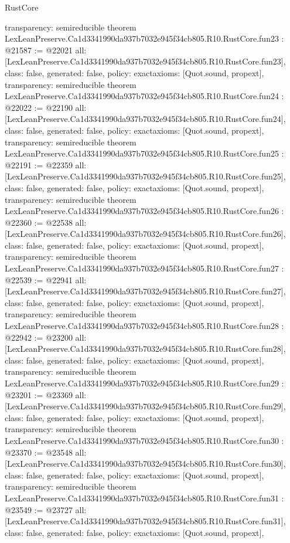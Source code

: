 \begin{lexlean}{RustCore}
\begin{coremodule}
{  transparency: semireducible
}
theorem LexLeanPreserve.Ca1d3341990da937b7032e945f34cb805.R10.RustCore.fun23 : @21587 := @22021 {
  all: [LexLeanPreserve.Ca1d3341990da937b7032e945f34cb805.R10.RustCore.fun23],
  class: false,
  generated: false,
  policy: exact{axioms: [Quot.sound, propext]},
  transparency: semireducible
}
theorem LexLeanPreserve.Ca1d3341990da937b7032e945f34cb805.R10.RustCore.fun24 : @22022 := @22190 {
  all: [LexLeanPreserve.Ca1d3341990da937b7032e945f34cb805.R10.RustCore.fun24],
  class: false,
  generated: false,
  policy: exact{axioms: [Quot.sound, propext]},
  transparency: semireducible
}
theorem LexLeanPreserve.Ca1d3341990da937b7032e945f34cb805.R10.RustCore.fun25 : @22191 := @22359 {
  all: [LexLeanPreserve.Ca1d3341990da937b7032e945f34cb805.R10.RustCore.fun25],
  class: false,
  generated: false,
  policy: exact{axioms: [Quot.sound, propext]},
  transparency: semireducible
}
theorem LexLeanPreserve.Ca1d3341990da937b7032e945f34cb805.R10.RustCore.fun26 : @22360 := @22538 {
  all: [LexLeanPreserve.Ca1d3341990da937b7032e945f34cb805.R10.RustCore.fun26],
  class: false,
  generated: false,
  policy: exact{axioms: [Quot.sound, propext]},
  transparency: semireducible
}
theorem LexLeanPreserve.Ca1d3341990da937b7032e945f34cb805.R10.RustCore.fun27 : @22539 := @22941 {
  all: [LexLeanPreserve.Ca1d3341990da937b7032e945f34cb805.R10.RustCore.fun27],
  class: false,
  generated: false,
  policy: exact{axioms: [Quot.sound, propext]},
  transparency: semireducible
}
theorem LexLeanPreserve.Ca1d3341990da937b7032e945f34cb805.R10.RustCore.fun28 : @22942 := @23200 {
  all: [LexLeanPreserve.Ca1d3341990da937b7032e945f34cb805.R10.RustCore.fun28],
  class: false,
  generated: false,
  policy: exact{axioms: [Quot.sound, propext]},
  transparency: semireducible
}
theorem LexLeanPreserve.Ca1d3341990da937b7032e945f34cb805.R10.RustCore.fun29 : @23201 := @23369 {
  all: [LexLeanPreserve.Ca1d3341990da937b7032e945f34cb805.R10.RustCore.fun29],
  class: false,
  generated: false,
  policy: exact{axioms: [Quot.sound, propext]},
  transparency: semireducible
}
theorem LexLeanPreserve.Ca1d3341990da937b7032e945f34cb805.R10.RustCore.fun30 : @23370 := @23548 {
  all: [LexLeanPreserve.Ca1d3341990da937b7032e945f34cb805.R10.RustCore.fun30],
  class: false,
  generated: false,
  policy: exact{axioms: [Quot.sound, propext]},
  transparency: semireducible
}
theorem LexLeanPreserve.Ca1d3341990da937b7032e945f34cb805.R10.RustCore.fun31 : @23549 := @23727 {
  all: [LexLeanPreserve.Ca1d3341990da937b7032e945f34cb805.R10.RustCore.fun31],
  class: false,
  generated: false,
  policy: exact{axioms: [Quot.sound, propext]},
}
\end{coremodule}
\end{lexlean}
